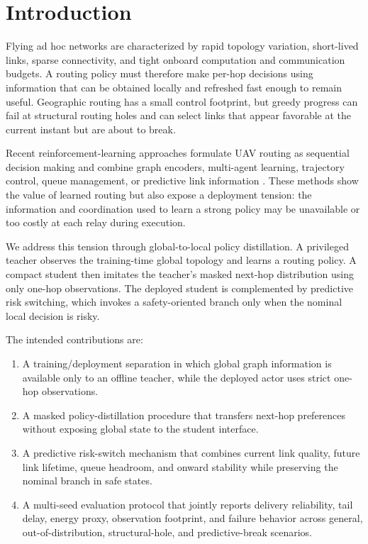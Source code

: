 \documentclass[preprint,12pt]{elsarticle}
\begin{document}
\section{Introduction}

Flying ad hoc networks are characterized by rapid topology variation, short-lived links, sparse connectivity, and tight onboard computation and communication budgets. A routing policy must therefore make per-hop decisions using information that can be obtained locally and refreshed fast enough to remain useful. Geographic routing has a small control footprint, but greedy progress can fail at structural routing holes and can select links that appear favorable at the current instant but are about to break.

Recent reinforcement-learning approaches formulate UAV routing as sequential decision making and combine graph encoders, multi-agent learning, trajectory control, queue management, or predictive link information \cite{Alam2024JTFR,Wu2026AoI,Shou2026Adaptive,Zhang2026LargeScale}. These methods show the value of learned routing but also expose a deployment tension: the information and coordination used to learn a strong policy may be unavailable or too costly at each relay during execution.

We address this tension through global-to-local policy distillation. A privileged teacher observes the training-time global topology and learns a routing policy. A compact student then imitates the teacher's masked next-hop distribution using only one-hop observations. The deployed student is complemented by predictive risk switching, which invokes a safety-oriented branch only when the nominal local decision is risky.

The intended contributions are:

\begin{enumerate}[leftmargin=*]
    \item A training/deployment separation in which global graph information is available only to an offline teacher, while the deployed actor uses strict one-hop observations.
    \item A masked policy-distillation procedure that transfers next-hop preferences without exposing global state to the student interface.
    \item A predictive risk-switch mechanism that combines current link quality, future link lifetime, queue headroom, and onward stability while preserving the nominal branch in safe states.
    \item A multi-seed evaluation protocol that jointly reports delivery reliability, tail delay, energy proxy, observation footprint, and failure behavior across general, out-of-distribution, structural-hole, and predictive-break scenarios.
\end{enumerate}
\end{document}
